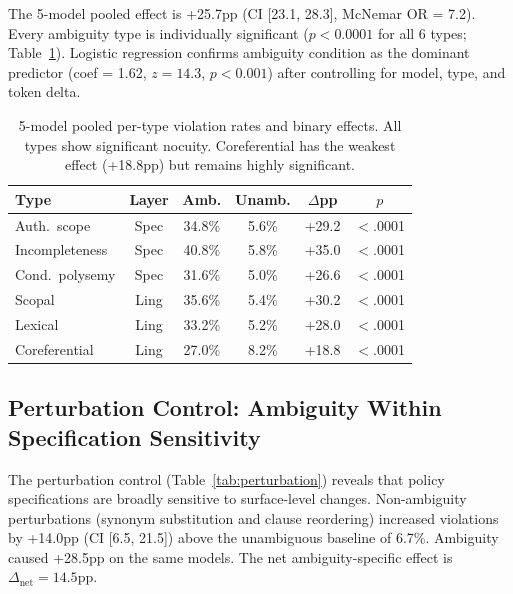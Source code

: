 \documentclass[11pt]{article}
\begin{document}
The 5-model pooled effect is +25.7pp (CI [23.1, 28.3], McNemar OR = 7.2). Every ambiguity type is individually significant ($p < 0.0001$ for all 6 types; Table~\ref{tab:per_type}). Logistic regression confirms ambiguity condition as the dominant predictor (coef = 1.62, $z = 14.3$, $p < 0.001$) after controlling for model, type, and token delta.

\begin{table}[t]
\centering
\small
\begin{tabular}{lccccc}
\toprule
\textbf{Type} & \textbf{Layer} & \textbf{Amb.} & \textbf{Unamb.} & \textbf{$\Delta$pp} & \textbf{$p$} \\
\midrule
Auth.\ scope & Spec & 34.8\% & 5.6\% & +29.2 & $<$.0001 \\
Incompleteness & Spec & 40.8\% & 5.8\% & +35.0 & $<$.0001 \\
Cond.\ polysemy & Spec & 31.6\% & 5.0\% & +26.6 & $<$.0001 \\
Scopal & Ling & 35.6\% & 5.4\% & +30.2 & $<$.0001 \\
Lexical & Ling & 33.2\% & 5.2\% & +28.0 & $<$.0001 \\
Coreferential & Ling & 27.0\% & 8.2\% & +18.8 & $<$.0001 \\
\bottomrule
\end{tabular}
\caption{5-model pooled per-type violation rates and binary effects. All types show significant nocuity. Coreferential has the weakest effect (+18.8pp) but remains highly significant.}
\label{tab:per_type}
\end{table}

\subsection{Perturbation Control: Ambiguity Within Specification Sensitivity}

The perturbation control (Table~\ref{tab:perturbation}) reveals that policy specifications are broadly sensitive to surface-level changes. Non-ambiguity perturbations (synonym substitution and clause reordering) increased violations by +14.0pp (CI [6.5, 21.5]) above the unambiguous baseline of 6.7\%. Ambiguity caused +28.5pp on the same models. The net ambiguity-specific effect is $\Delta_{\text{net}} = 14.5$pp.
\end{document}
